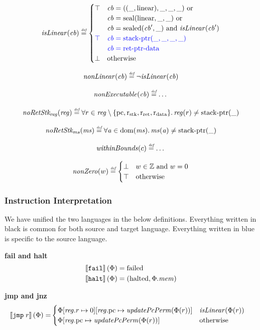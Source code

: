 \documentclass[a4paper]{article}
\newcommand{\defeq}{\stackrel{\textit{\tiny{def}}}{=}}
\newcommand{\sem}[1]{\left\llbracket #1 \right\rrbracket}
\newcommand{\dom}{\mathrm{dom}}
\newcommand{\tand}{\text{ and }}
\newcommand{\tor}{\text{ or }}
\newcommand{\totherwise}{\text{otherwise }}
\newcommand{\sourcecolor}[1]{\color{blue}}
\newcommand{\src}[1]{{\sourcecolor{} #1}}
\newcommand{\targetcolor}[1]{\color{black}}
\newcommand{\trg}[1]{{\targetcolor{} #1}}
\newcommand{\zinstr}[1]{\texttt{#1}}
\newcommand{\oneinstr}[2]{
  \ifthenelse{\equal{#2}{}}
  {\zinstr{#1}}
  {\zinstr{#1} \; #2}
}
\newcommand{\tfail}{\zinstr{\trg{fail}}}
\newcommand{\thalt}{\zinstr{\trg{halt}}}
\newcommand{\tjmp}[1]{\oneinstr{\trg{jmp}}{#1}}
\newcommand{\ints}{\mathbb{Z}}
\newcommand{\update}[2]{[#1 \mapsto #2]}
\newcommand{\updReg}[2]{\update{\reg.#1}{#2}}
\newcommand{\shareddom}[1]{\mathrm{#1}}
\newcommand{\stkptr}[1]{\mathrm{stack\text{-}ptr}(#1)}
\newcommand{\retptrd}{\mathrm{ret\text{-}ptr\text{-}data}}
\newcommand{\seal}[1]{\shareddom{seal}(#1)}
\newcommand{\sealed}[1]{\shareddom{sealed}(#1)}
\newcommand{\failed}{\mathrm{failed}}
\newcommand{\halted}{\mathrm{halted}}
\newcommand{\var}[1]{\mathit{#1}}
\newcommand{\reg}{\var{reg}}
\newcommand{\mem}{\var{mem}}
\newcommand{\ms}{\var{ms}}
\newcommand{\cb}{\var{cb}}
\newcommand{\aaddr}{\var{a}}
\newcommand{\pcreg}{\mathrm{pc}}
\newcommand{\rstk}{\mathrm{r}_\mathrm{stk}}
\newcommand{\rO}{\mathrm{r}_\mathrm{ret}}
\newcommand{\rret}{\rO}
\newcommand{\rdata}{\mathrm{r}_\mathrm{data}}
\newcommand{\plainlinearity}[1]{\mathrm{#1}}
\newcommand{\linear}{\plainlinearity{linear}}
\newcommand{\plainfun}[2]{
  \ifthenelse{\equal{#2}{}}
  {\mathit{#1}}
  {\mathit{#1}(#2)}
}
\newcommand{\updPcPerm}[1]{\plainfun{updatePcPerm}{#1}}
\newcommand{\nonExec}[1]{\plainfun{nonExecutable}{#1}}
\newcommand{\nonLinear}[1]{\plainfun{nonLinear}{#1}}
\newcommand{\isLinear}[1]{\plainfun{isLinear}{#1}}
\newcommand{\noRetStkReg}[1]{\plainfun{noRetStk_{reg}}{#1}}
\newcommand{\noRetStkMs}[1]{\plainfun{noRetStk_{ms}}{#1}}
\newcommand{\withinBounds}[1]{\plainfun{withinBounds}{#1}}
\newcommand{\nonZero}[1]{\plainfun{nonZero}{#1}}
\begin{document}
\[
  \isLinear{\cb} \defeq
  \begin{cases}
    \top & 
    \arraycolsep=0pt
    \begin{array}[t]{l}
      \cb = ((\_,\linear),\_,\_,\_) \tor\\
      \cb = \seal{\linear,\_,\_} \tor\\
      \cb = \sealed{\cb',\_} \tand \isLinear{\cb'} 
    \end{array}\\
    \src{\top} & 
    \arraycolsep=0pt
    \begin{array}[t]{l}
      \src{\cb = \stkptr{\_,\_,\_,\_}}\\
      \src{\cb = \retptrd{}}
    \end{array}\\
    \bot & \totherwise
  \end{cases}
\]

\[
  \nonLinear{\cb} \defeq \neg \isLinear{\cb}
\]

\[
  \nonExec{\cb} \defeq \dots
\]


\[
  \noRetStkReg{\reg} \defeq \forall r \in \reg \setminus \{ \pcreg, \rstk, \rret, \rdata \} \ldotp \reg(r) \neq \stkptr{\_}
\]

\[
  \noRetStkMs{\ms} \defeq \forall \aaddr \in \dom(\ms) \ldotp \ms(\aaddr) \neq \stkptr{\_}
\]

\[
  \withinBounds{c} \defeq \dots
\]

\[
  \nonZero{w} \defeq
  \begin{cases}
    \bot & w \in \ints \tand w = 0 \\
    \top & \totherwise
  \end{cases}
\]

\subsubsection{Instruction Interpretation}
We have unified the two languages in the below definitions. Everything written in black is common for both source and target language. Everything written in \src{blue} is specific to the source language.

\noindent\textbf{fail and halt}\\
\begin{align*}
  \sem{\tfail}(\Phi) = & \; \failed \\
  \sem{\thalt}(\Phi) = & \; (\halted, \Phi.\mem)
\end{align*}

\noindent\textbf{jmp and jnz}\\
\begin{align*}
  \sem{\tjmp{r}}(\Phi) = &  
                     \begin{cases}
                       \Phi\updReg{r}{0}\updReg{\pcreg}{\updPcPerm{\Phi(r)}} & \isLinear{\Phi(r)} \\
                       \Phi\updReg{\pcreg}{\updPcPerm{\Phi(r)}} & \totherwise
                     \end{cases}
\end{align*}
\end{document}

